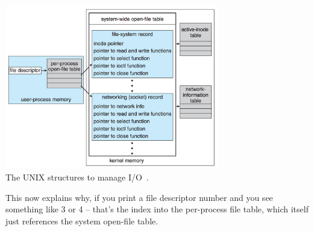 \begin{center}
	\includegraphics[width=0.7\textwidth]{images/unix-io-kernel.png}\\
	The UNIX structures to manage I/O~\cite{osc}.
\end{center}

This now explains why, if you print a file descriptor number and you see something like 3 or 4 -- that's the index into the per-process file table, which itself just references the system open-file table.



